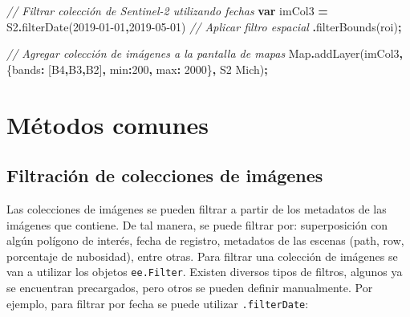 \documentclass[
  12pt,
  letterpaper,
  twoside]{book}
\newenvironment{Shaded}{\begin{snugshade}}{\end{snugshade}}
\newcommand{\BuiltInTok}[1]{#1}
\newcommand{\CommentTok}[1]{\textcolor[rgb]{0.56,0.35,0.01}{\textit{#1}}}
\newcommand{\DataTypeTok}[1]{\textcolor[rgb]{0.13,0.29,0.53}{#1}}
\newcommand{\DecValTok}[1]{\textcolor[rgb]{0.00,0.00,0.81}{#1}}
\newcommand{\FunctionTok}[1]{\textcolor[rgb]{0.00,0.00,0.00}{#1}}
\newcommand{\KeywordTok}[1]{\textcolor[rgb]{0.13,0.29,0.53}{\textbf{#1}}}
\newcommand{\NormalTok}[1]{#1}
\newcommand{\OperatorTok}[1]{\textcolor[rgb]{0.81,0.36,0.00}{\textbf{#1}}}
\newcommand{\StringTok}[1]{\textcolor[rgb]{0.31,0.60,0.02}{#1}}
\begin{document}
\begin{Shaded}
\begin{Highlighting}[]
\CommentTok{// Filtrar colección de Sentinel{-}2 utilizando fechas}
\KeywordTok{var}\NormalTok{ imCol3 }\OperatorTok{=}\NormalTok{ S2}\OperatorTok{.}\FunctionTok{filterDate}\NormalTok{(}\StringTok{\textquotesingle{}2019{-}01{-}01\textquotesingle{}}\OperatorTok{,}\StringTok{\textquotesingle{}2019{-}05{-}01\textquotesingle{}}\NormalTok{)}
  \CommentTok{// Aplicar filtro espacial}
 \OperatorTok{.}\FunctionTok{filterBounds}\NormalTok{(roi)}\OperatorTok{;}

\CommentTok{// Agregar colección de imágenes a la pantalla de mapas}
\BuiltInTok{Map}\OperatorTok{.}\FunctionTok{addLayer}\NormalTok{(imCol3}\OperatorTok{,}\NormalTok{ \{}\DataTypeTok{bands}\OperatorTok{:}\NormalTok{ [}\StringTok{\textquotesingle{}B4\textquotesingle{}}\OperatorTok{,}\StringTok{\textquotesingle{}B3\textquotesingle{}}\OperatorTok{,}\StringTok{\textquotesingle{}B2\textquotesingle{}}\NormalTok{]}\OperatorTok{,} \DataTypeTok{min}\OperatorTok{:}\DecValTok{200}\OperatorTok{,} \DataTypeTok{max}\OperatorTok{:} \DecValTok{2000}\NormalTok{\}}\OperatorTok{,} 
  \StringTok{\textquotesingle{}S2 Mich\textquotesingle{}}\NormalTok{)}\OperatorTok{;}
\end{Highlighting}
\end{Shaded}

\hypertarget{muxe9todos-comunes-4}{%
\section{Métodos comunes}\label{muxe9todos-comunes-4}}

\hypertarget{filtraciuxf3n-de-colecciones-de-imuxe1genes}{%
\subsection{Filtración de colecciones de imágenes}\label{filtraciuxf3n-de-colecciones-de-imuxe1genes}}

Las colecciones de imágenes se pueden filtrar a partir de los metadatos de las imágenes que contiene. De tal manera, se puede filtrar por: superposición con algún polígono de interés, fecha de registro, metadatos de las escenas (path, row, porcentaje de nubosidad), entre otras. Para filtrar una colección de imágenes se van a utilizar los objetos \texttt{ee.Filter}. Existen diversos tipos de filtros, algunos ya se encuentran precargados, pero otros se pueden definir manualmente. Por ejemplo, para filtrar por fecha se puede utilizar \texttt{.filterDate}:
\end{document}
